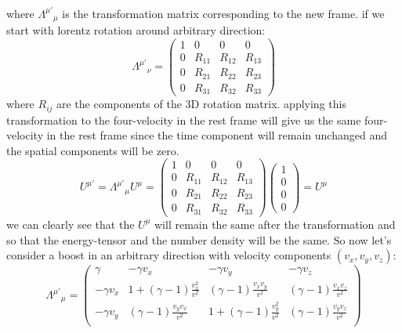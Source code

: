 \documentclass[11pt, a4paper]{report}
\begin{document}
\begin{itemize}
\begin{align*}
    \end{align*}
    where ${\Lambda^{\mu'}}_\mu$ is the transformation matrix corresponding to the new frame. if we start with lorentz rotation around arbitrary direction:
    \begin{equation}
        {\Lambda^{\mu'}}_\nu =
        \begin{pmatrix}
        1 & 0 & 0 & 0 \\
        0 & R_{11} & R_{12} & R_{13} \\
        0 & R_{21} & R_{22} & R_{23} \\
        0 & R_{31} & R_{32} & R_{33}
        \end{pmatrix}
    \end{equation}
    where $R_{ij}$ are the components of the 3D rotation matrix. applying this transformation to the four-velocity in the rest frame will give us the same four-velocity in the rest frame since the time component will remain unchanged and the spatial components will be zero.
    \begin{equation}
        U^{\mu'} = {\Lambda^{\mu'}}_\mu U^\mu = 
        \begin{pmatrix}
        1 & 0 & 0 & 0 \\
        0 & R_{11} & R_{12} & R_{13} \\
        0 & R_{21} & R_{22} & R_{23} \\
        0 & R_{31} & R_{32} & R_{33}
        \end{pmatrix}
        \begin{pmatrix}
            1 \\
            0\\
            0 \\
            0
        \end{pmatrix} = U^\mu
    \end{equation}
    we can clearly see that the $U^\mu$ will remain the same after the transformation and so that the energy-tensor and the number density will be the same. So now let's consider a boost in an arbitrary direction with velocity components $(v_x, v_y, v_z)$:
    \begin{equation}
    {\Lambda^{\mu'}}_\mu =
        \begin{pmatrix}
        \gamma & -\gamma v_x & -\gamma v_y & -\gamma v_z \\
        -\gamma v_x & 1+(\gamma-1)\frac{v_x^2}{v^2} & (\gamma-1)\frac{v_x v_y}{v^2} & (\gamma-1)\frac{v_x v_z}{v^2} \\
        -\gamma v_y & (\gamma-1)\frac{v_y v_x}{v^2} & 1+(\gamma-1)\frac{v_y^2}{v^2} & (\gamma-1)\frac{v_y v_z}{v^2} \\

\end{pmatrix}
\end{equation}
\end{itemize}
\end{document}
